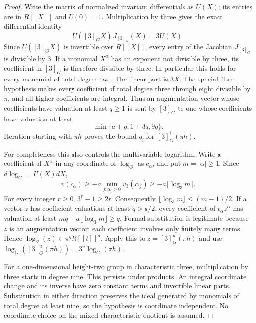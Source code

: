 \begin{proof}
Write the matrix of normalized invariant differentials as $U(X)$;
its entries are in $R[[X]]$ and $U(0)=1$. Multiplication by three gives
the exact differential identity
\[
     U([3]_G X)\,J_{[3]_G}(X)=3U(X).
                                                        \tag{B-RD34.3}
\]
Since $U([3]_GX)$ is invertible over $R[[X]]$, every entry of the
Jacobian $J_{[3]_G}$ is divisible by $3$. If a monomial $X^\alpha$ has
an exponent not divisible by three, its coefficient in $[3]_G$ is
therefore divisible by three. In particular this holds for every
monomial of total degree two. The linear part is $3X$. The special-fibre
hypothesis makes every coefficient of total degree three through eight
divisible by $\pi$, and all higher coefficients are integral. Thus an
augmentation vector whose coefficients have valuation at least $q\geq1$
is sent by $[3]_G$ to one whose coefficients have valuation at least
\[
                        \min\{a+q,1+3q,9q\}.
\]
Iteration starting with $\pi h$ proves the bound $q_i$ for
$[3]^i_G(\pi h)$.

For completeness this also controls the multivariable logarithm.
Write a coefficient of $X^\alpha$ in any coordinate of $\log_G$ as
$c_\alpha$, and put $m=|\alpha|\geq1$. Since $d\log_G=U(X)dX$,
\[
 v(c_\alpha)\geq
       -a\min_{j:\alpha_j>0}v_3(\alpha_j)
       \geq-a\lfloor\log_3m\rfloor.
                                                        \tag{B-RD34.4}
\]
For every integer $r\geq0$, $3^r-1\geq2r$. Consequently
$\lfloor\log_3m\rfloor\leq(m-1)/2$. If a vector $z$ has coefficient
valuations at least $q>a/2$, every coefficient of
$c_\alpha z^\alpha$ has valuation at least
$mq-a\lfloor\log_3m\rfloor\geq q$. Formal substitution is legitimate
because $z$ is an augmentation vector; each coefficient involves only
finitely many terms. Hence $\log_G(z)\in\pi^qR[[t]]^d$.
Apply this to $z=[3]^u_G(\pi h)$ and use
$\log_G([3]^u_G(\pi h))=3^u\log_G(\pi h)$.

For a one-dimensional height-two group in characteristic three,
multiplication by three starts in degree nine. This persists under
products. An integral coordinate change and its inverse have zero
constant terms and invertible linear parts. Substitution in either
direction preserves the ideal generated by monomials of total degree
at least nine, so the hypothesis is coordinate independent. No
coordinate choice on the mixed-characteristic quotient is assumed.
\end{proof}

